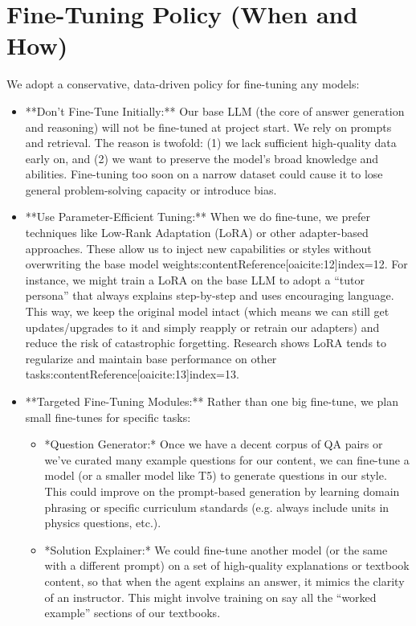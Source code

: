 \documentclass[11pt]{article}
\begin{document}
\section{Fine-Tuning Policy (When and How)}
We adopt a conservative, data-driven policy for fine-tuning any models:
\begin{itemize}
  \item **Don’t Fine-Tune Initially:** Our base LLM (the core of answer generation and reasoning) will not be fine-tuned at project start. We rely on prompts and retrieval. The reason is twofold: (1) we lack sufficient high-quality data early on, and (2) we want to preserve the model’s broad knowledge and abilities. Fine-tuning too soon on a narrow dataset could cause it to lose general problem-solving capacity or introduce bias.
  \item **Use Parameter-Efficient Tuning:** When we do fine-tune, we prefer techniques like Low-Rank Adaptation (LoRA) or other adapter-based approaches. These allow us to inject new capabilities or styles without overwriting the base model weights:contentReference[oaicite:12]{index=12}. For instance, we might train a LoRA on the base LLM to adopt a “tutor persona” that always explains step-by-step and uses encouraging language. This way, we keep the original model intact (which means we can still get updates/upgrades to it and simply reapply or retrain our adapters) and reduce the risk of catastrophic forgetting. Research shows LoRA tends to regularize and maintain base performance on other tasks:contentReference[oaicite:13]{index=13}.
  \item **Targeted Fine-Tuning Modules:** Rather than one big fine-tune, we plan small fine-tunes for specific tasks:
    \begin{itemize}
      \item *Question Generator:* Once we have a decent corpus of QA pairs or we’ve curated many example questions for our content, we can fine-tune a model (or a smaller model like T5) to generate questions in our style. This could improve on the prompt-based generation by learning domain phrasing or specific curriculum standards (e.g. always include units in physics questions, etc.).
      \item *Solution Explainer:* We could fine-tune another model (or the same with a different prompt) on a set of high-quality explanations or textbook content, so that when the agent explains an answer, it mimics the clarity of an instructor. This might involve training on say all the “worked example” sections of our textbooks.

\end{itemize}
\end{itemize}
\end{document}
